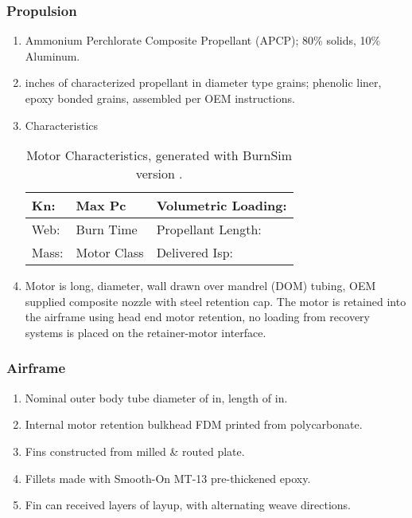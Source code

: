 \documentclass[12pt]{article}
\newcommand{\ph}{\framebox[48pt]{\rule{0pt}{12pt}}}
\begin{document}
\subsubsection{Propulsion}
\begin{enumerate}[label=(\alph*)]
    \item Ammonium Perchlorate Composite Propellant (APCP); 80\% solids, 10\% Aluminum.
    \item \ph inches of characterized propellant in \ph diameter \ph type grains; phenolic liner, epoxy bonded grains, assembled per OEM instructions.
    \item Characteristics
    \begin{table}[H]
        \centering
        \caption{Motor Characteristics, generated with BurnSim version \ph.}
        \begin{tabular}{|l|l|l|}
            \hline
            Kn: \ph & Max Pc \ph & Volumetric Loading: \ph \\ \hline
            Web: \ph & Burn Time \ph & Propellant Length: \ph \\ \hline
            Mass: \ph & Motor Class \ph & Delivered Isp: \ph \\ \hline
        \end{tabular}
    \end{table}
    \item Motor is \ph long, \ph diameter, \ph wall drawn over mandrel (DOM) tubing,
    OEM supplied composite nozzle with steel retention cap.
    The motor is retained into the airframe using head end motor retention,
    no loading from recovery systems is placed on the retainer-motor interface.
\end{enumerate}
\subsubsection{Airframe}
\begin{enumerate}[label=(\alph*)]
    \item Nominal outer body tube diameter of \ph in, length of \ph in.
    \item Internal motor retention bulkhead FDM printed from polycarbonate.
    \item Fins constructed from milled \& routed \ph plate.
    \item Fillets made with Smooth-On MT-13 pre-thickened epoxy.
    \item Fin can received \ph layers of \ph layup, with alternating weave directions.
\end{enumerate}
\end{document}
